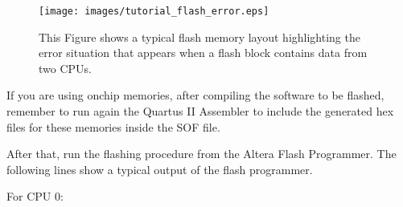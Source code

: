 %
\begin{figure}
\texttt{[image: images/tutorial\_flash\_error.eps]}
\caption{\label{fig:tutorial-flash-error}This Figure shows a typical
flash memory layout highlighting the error situation that appears when
a flash block contains data from two CPUs.}
\end{figure}

\begin{warning}
If you are using onchip memories, after compiling the software to be
flashed, remember to run again the Quartus II Assembler to include the
generated hex files for these memories inside the SOF file.
\end{warning}

After that, run the flashing procedure from the Altera Flash
Programmer. The following lines show a typical output of the flash
programmer.

For CPU 0:

